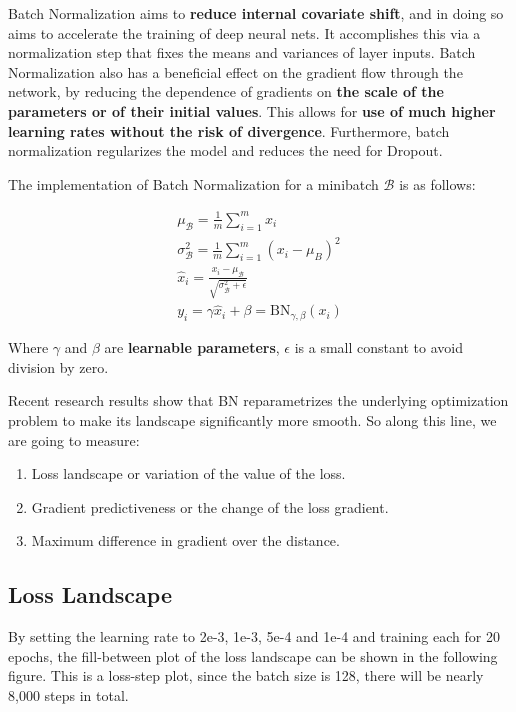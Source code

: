 \documentclass[a4paper, 11pt]{article} %
\begin{document}
Batch Normalization aims to \textbf{reduce internal covariate shift}, and in doing so aims
to accelerate the training of deep neural nets. It accomplishes this via a normalization
step that fixes the means and variances of layer inputs. Batch Normalization also has a
beneficial effect on the gradient flow through the network, by reducing the dependence of
gradients on \textbf{the scale of the parameters or of their initial values}. This allows
for \textbf{use of much higher learning rates without the risk of divergence}. Furthermore,
batch normalization regularizes the model and reduces the need for Dropout.

The implementation of Batch Normalization for a minibatch $\mathcal{B}$ is as follows:

$$
	\begin{gathered}
		\mu_{\mathcal{B}}=\frac{1}{m} \sum_{i=1}^{m} x_{i} \\
		\sigma_{\mathcal{B}}^{2}=\frac{1}{m} \sum_{i=1}^{m}\left(x_{i}-\mu_{B}\right)^{2} \\
		\hat{x}_{i}=\frac{x_{i}-\mu_{\mathcal{B}}}{\sqrt{\sigma_{\mathcal{B}}^{2}+\epsilon}} \\
		y_{i}=\gamma \hat{x}_{i}+\beta=\mathrm{BN}_{\gamma, \beta}\left(x_{i}\right)
	\end{gathered}
$$

Where $\gamma$ and $\beta$ are \textbf{learnable parameters}, $\epsilon$ is a small constant
to avoid division by zero.

Recent research results show that BN reparametrizes the underlying optimization problem to
make its landscape significantly more smooth. So along this line, we are going to measure:

\begin{enumerate}
	\item Loss landscape or variation of the value of the loss.
	\item Gradient predictiveness or the change of the loss gradient.
	\item Maximum difference in gradient over the distance.
\end{enumerate}

\subsection{\textbf{Loss Landscape}}

By setting the learning rate to 2e-3, 1e-3, 5e-4 and 1e-4 and training each for 20 epochs,
the fill-between plot of the loss landscape can be shown in the following figure. This is
a loss-step plot, since the batch size is 128, there will be nearly 8,000 steps in total.
\end{document}
